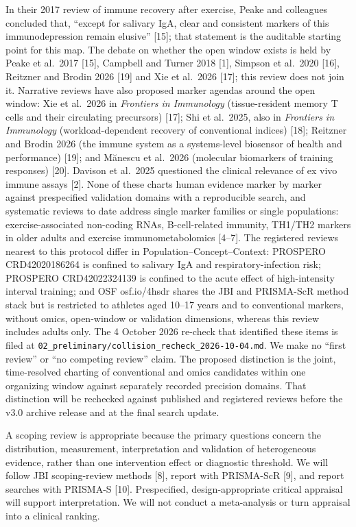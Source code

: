 \documentclass[
  11pt,
  a4paper,
]{article}
\begin{document}
In their 2017 review of immune recovery after exercise, Peake and
colleagues concluded that, ``except for salivary IgA, clear and
consistent markers of this immunodepression remain elusive'' {[}15{]};
that statement is the auditable starting point for this map. The debate
on whether the open window exists is held by Peake et al.~2017 {[}15{]},
Campbell and Turner 2018 {[}1{]}, Simpson et al.~2020 {[}16{]}, Reitzner
and Brodin 2026 {[}19{]} and Xie et al.~2026 {[}17{]}; this review does
not join it. Narrative reviews have also proposed marker agendas around
the open window: Xie et al.~2026 in \emph{Frontiers in Immunology}
(tissue-resident memory T cells and their circulating precursors)
{[}17{]}; Shi et al.~2025, also in \emph{Frontiers in Immunology}
(workload-dependent recovery of conventional indices) {[}18{]}; Reitzner
and Brodin 2026 (the immune system as a systems-level biosensor of
health and performance) {[}19{]}; and Mănescu et al.~2026 (molecular
biomarkers of training responses) {[}20{]}. Davison et al.~2025
questioned the clinical relevance of ex vivo immune assays {[}2{]}. None
of these charts human evidence marker by marker against prespecified
validation domains with a reproducible search, and systematic reviews to
date address single marker families or single populations:
exercise-associated non-coding RNAs, B-cell-related immunity, TH1/TH2
markers in older adults and exercise immunometabolomics {[}4--7{]}. The
registered reviews nearest to this protocol differ in
Population--Concept--Context: PROSPERO CRD42020186264 is confined to
salivary IgA and respiratory-infection risk; PROSPERO CRD42022324139 is
confined to the acute effect of high-intensity interval training; and
OSF osf.io/4hsdr shares the JBI and PRISMA-ScR method stack but is
restricted to athletes aged 10--17 years and to conventional markers,
without omics, open-window or validation dimensions, whereas this review
includes adults only. The 4 October 2026 re-check that identified these
items is filed at
\texttt{02\_preliminary/collision\_recheck\_2026-10-04.md}. We make no
``first review'' or ``no competing review'' claim. The proposed
distinction is the joint, time-resolved charting of conventional and
omics candidates within one organizing window against separately
recorded precision domains. That distinction will be rechecked against
published and registered reviews before the v3.0 archive release and at
the final search update.

A scoping review is appropriate because the primary questions concern
the distribution, measurement, interpretation and validation of
heterogeneous evidence, rather than one intervention effect or
diagnostic threshold. We will follow JBI scoping-review methods {[}8{]},
report with PRISMA-ScR {[}9{]}, and report searches with PRISMA-S
{[}10{]}. Prespecified, design-appropriate critical appraisal will
support interpretation. We will not conduct a meta-analysis or turn
appraisal into a clinical ranking.
\end{document}
